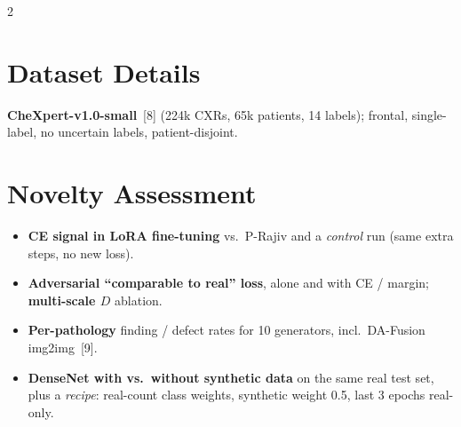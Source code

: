\documentclass[a0,portrait]{a0poster}
\begin{document}
\begin{minipage}[c]{\linewidth}
\begin{framed}
\begin{multicols}{2}
\section*{Dataset Details}
\textbf{CheXpert-v1.0-small}~[8] (224k CXRs, 65k patients, 14 labels); frontal, single-label, no uncertain labels, patient-disjoint.
\begin{center}
\end{center}

\section*{Novelty Assessment}
\begin{itemize}
	\item \textbf{CE signal in LoRA fine-tuning} vs.\ P-Rajiv and a \emph{control} run (same extra steps, no new loss).
	\item \textbf{Adversarial ``comparable to real'' loss}, alone and with CE / margin; \textbf{multi-scale $D$} ablation.
	\item \textbf{Per-pathology} finding / defect rates for 10 generators, incl.\ DA-Fusion img2img~[9].
	\item \textbf{DenseNet with vs.\ without synthetic data} on the same real test set, plus a \emph{recipe}: real-count class weights, synthetic weight 0.5, last 3 epochs real-only.
\end{itemize}


\end{multicols}
\end{framed}
\end{minipage}
\end{document}
